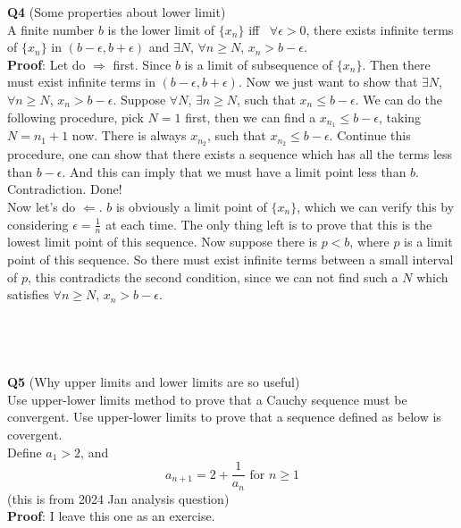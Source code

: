 \documentclass{article}
\newcommand{\tb}[1]{\textbf{#1}}
\begin{document}
\\
\\
\\
\\
\\
\tb{Q4} (Some properties about lower limit)\\
A finite number $b$ is the lower limit of $\{x_n\}$ iff \  $\forall \epsilon > 0$, there exists infinite terms of 
$\{x_n\}$ in $(b - \epsilon, b + \epsilon)$ and $\exists N$, $\forall n \geq N$, $x_n > b - \epsilon$.\\
\tb{Proof}:
Let do $\Longrightarrow$ first. Since $b$ is a limit of subsequence of $\{x_n\}$. Then there must exist infinite 
terms in $(b - \epsilon, b + \epsilon)$. Now we just want to show that $\exists N$, $\forall n \geq N$, $x_n > b - \epsilon$. 
Suppose $\forall N$, $\exists n \geq N$, such that $x_n \leq b - \epsilon$. We can do the following procedure, pick $N = 1$ first,
then we can find a $x_{n_1} \leq b - \epsilon$, taking $N = n_1+1$ now. There is always $x_{n_2}$, such that $x_{n_2} \leq b - \epsilon$.
Continue this procedure, one can show that there exists a sequence which has all the terms less than $b-\epsilon$. And this can imply that 
we must have a limit point less than $b$. Contradiction. Done!\\
Now let's do $\Longleftarrow$. $b$ is obviously a limit point of $\{x_n\}$, which we can verify this by considering $\epsilon = \frac{1}{n}$
at each time. The only thing left is to prove that this is the lowest limit point of this sequence. Now suppose there is $p < b$, where $p$ is 
a limit point of this sequence. So there must exist infinite terms between a small interval of $p$, this contradicts the second condition, since 
we can not find such a $N$ which satisfies $\forall n \geq N$, $x_n > b - \epsilon$. \\
\\
\\
\\
\\
\tb{Q5} (Why upper limits and lower limits are so useful)\\
Use upper-lower limits method to prove that a Cauchy sequence must be convergent. Use upper-lower limits to prove that a sequence defined as below is 
covergent.\\
Define $a_1 > 2$, and 
$$
a_{n+1} = 2 + \frac{1}{a_n} \text{ for } n \geq 1
$$
(this is from 2024 Jan analysis question)\\
\tb{Proof}: I leave this one as an exercise.\\
\newpage
\end{document}
